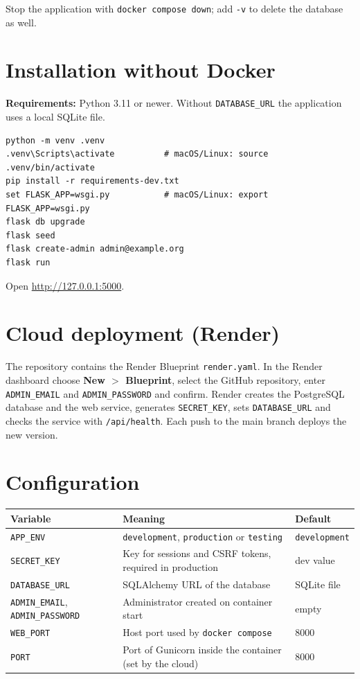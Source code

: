\documentclass[a4paper,11pt]{article}
\begin{document}
Stop the application with \texttt{docker compose down}; add \texttt{-v} to delete the database as well.

\section{Installation without Docker}
\textbf{Requirements:} Python 3.11 or newer. Without \texttt{DATABASE\_URL} the application uses a local SQLite file.

\begin{Verbatim}
python -m venv .venv
.venv\Scripts\activate          # macOS/Linux: source .venv/bin/activate
pip install -r requirements-dev.txt
set FLASK_APP=wsgi.py           # macOS/Linux: export FLASK_APP=wsgi.py
flask db upgrade
flask seed
flask create-admin admin@example.org
flask run
\end{Verbatim}

Open \url{http://127.0.0.1:5000}.

\section{Cloud deployment (Render)}
The repository contains the Render Blueprint \texttt{render.yaml}. In the Render
dashboard choose \textbf{New $>$ Blueprint}, select the GitHub repository, enter
\texttt{ADMIN\_EMAIL} and \texttt{ADMIN\_PASSWORD} and confirm. Render creates the
PostgreSQL database and the web service, generates \texttt{SECRET\_KEY}, sets
\texttt{DATABASE\_URL} and checks the service with \texttt{/api/health}. Each push to
the main branch deploys the new version.

\section{Configuration}
\begin{tabularx}{\textwidth}{|l|X|l|}
\hline
\textbf{Variable} & \textbf{Meaning} & \textbf{Default} \\ \hline
\texttt{APP\_ENV} & \texttt{development}, \texttt{production} or \texttt{testing} & \texttt{development} \\ \hline
\texttt{SECRET\_KEY} & Key for sessions and CSRF tokens, required in production & dev value \\ \hline
\texttt{DATABASE\_URL} & SQLAlchemy URL of the database & SQLite file \\ \hline
\texttt{ADMIN\_EMAIL}, \texttt{ADMIN\_PASSWORD} & Administrator created on container start & empty \\ \hline
\texttt{WEB\_PORT} & Host port used by \texttt{docker compose} & 8000 \\ \hline
\texttt{PORT} & Port of Gunicorn inside the container (set by the cloud) & 8000 \\ \hline
\end{tabularx}
\end{document}

